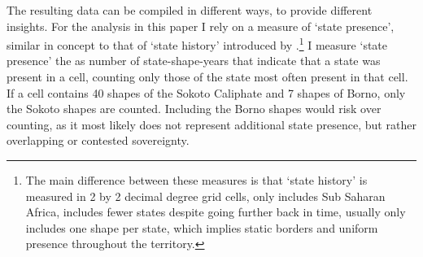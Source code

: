\documentclass[12pt]{article}
\begin{document}


The resulting data can be compiled in different ways, to provide different
insights. For the analysis in this paper I rely on a measure of `state
presence', similar in concept to that of `state history' introduced by
\citet{Depetris-Chauvin2016}.\footnote{The main difference between these
	measures is that `state history' is measured in 2 by 2 decimal degree
	grid cells, only includes Sub Saharan Africa, includes fewer states
	despite going further back in time, usually only includes one shape per
state, which implies static borders and uniform presence throughout the
territory.} I measure `state presence' the as number of state-shape-years that
indicate that a state was present in a cell, counting only those of the state
most often present in that cell. If a cell contains 40 shapes of the Sokoto
Caliphate and 7 shapes of Borno, only the Sokoto shapes are counted. Including
the Borno shapes would risk over counting, as it most likely does not represent
additional state presence, but rather overlapping or contested sovereignty.
\end{document}
